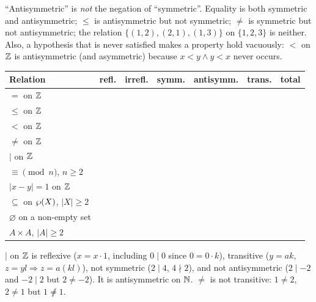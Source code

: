 \begin{warning}
	``Antisymmetric'' is \emph{not} the negation of ``symmetric''. Equality is both symmetric and antisymmetric; $\le$ is antisymmetric but not symmetric; $\neq$ is symmetric but not antisymmetric; the relation $\{(1,2),(2,1),(1,3)\}$ on $\{1,2,3\}$ is neither. Also, a hypothesis that is never satisfied makes a property hold vacuously: $<$ on $\mathbb{Z}$ is antisymmetric (and asymmetric) because $x<y\wedge y<x$ never occurs.
\end{warning}

\begin{center}
	\begin{tabular}{@{}p{4.3cm}cccccc@{}}
		\toprule
		\textbf{Relation} & refl. & irrefl. & symm. & antisymm. & trans. & total\\
		\midrule
		$=$ on $\mathbb{Z}$ & \checkmark & & \checkmark & \checkmark & \checkmark & \\
		$\le$ on $\mathbb{Z}$ & \checkmark & & & \checkmark & \checkmark & \checkmark\\
		$<$ on $\mathbb{Z}$ & & \checkmark & & \checkmark & \checkmark & \\
		$\ne$ on $\mathbb{Z}$ & & \checkmark & \checkmark & & & \\
		$\mid$ on $\mathbb{Z}$ & \checkmark & & & & \checkmark & \\
		$\equiv\pmod n$, $n\ge2$ & \checkmark & & \checkmark & & \checkmark & \\
		$|x-y|=1$ on $\mathbb{Z}$ & & \checkmark & \checkmark & & & \\
		$\subseteq$ on $\wp(X)$, $|X|\ge2$ & \checkmark & & & \checkmark & \checkmark & \\
		$\varnothing$ on a non-empty set & & \checkmark & \checkmark & \checkmark & \checkmark & \\
		$A\times A$, $|A|\ge2$ & \checkmark & & \checkmark & & \checkmark & \checkmark\\
		\bottomrule
	\end{tabular}
\end{center}

\begin{example}
	$\mid$ on $\mathbb{Z}$ is reflexive ($x=x\cdot1$, including $0\mid0$ since $0=0\cdot k$), transitive ($y=ak$, $z=yl\Rightarrow z=a(kl)$), not symmetric ($2\mid4$, $4\nmid2$), and not antisymmetric ($2\mid-2$ and $-2\mid2$ but $2\neq-2$). It is antisymmetric on $\mathbb{N}$. $\ne$ is not transitive: $1\ne2$, $2\ne1$ but $1\not\ne1$.
\end{example}

